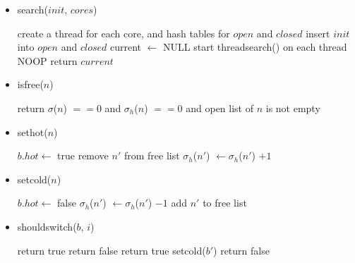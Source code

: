 \documentclass{article}
\begin{document}
\begin{itemize}
  \item search($init$, $cores$)
  \begin{algorithmic}[1]
  \STATE create a thread for each core, and hash tables for $open$ and $closed$
  \STATE insert $init$ into $open$ and $closed$
  \STATE current $\leftarrow$ NULL
  \STATE start threadsearch() on each thread
    \STATE NOOP
  \ENDWHILE
  \STATE return $current$
  \end{algorithmic}
  
  \item isfree($n$)
  \begin{algorithmic}[1]
  \STATE return $\sigma$($n$) $== 0$ and $\sigma_h$($n$) $== 0$ and open list of $n$ is not empty
  \end{algorithmic}
  
  \item sethot($n$)
  \begin{algorithmic}[1]
    \STATE $b.hot \leftarrow$ true
        \STATE remove $n'$ from free list
      \ENDIF
      \STATE $\sigma_h$($n'$) $\leftarrow \sigma_h$($n'$) $+ 1$
    \ENDFOR
  \ENDIF
  \end{algorithmic}
  
  \item setcold($n$)
  \begin{algorithmic}[1]
  \STATE $b.hot \leftarrow$ false
    \STATE $\sigma_h$($n'$) $\leftarrow \sigma_h$($n'$) $- 1$
      \STATE add $n'$ to free list
    \ENDIF
  \ENDFOR
  \end{algorithmic}

  \item shouldswitch($b$, $i$)
  \begin{algorithmic}[1]
  \STATE {}
    \STATE return true
  \ENDIF
    \STATE return false
    \STATE return true
  \ELSE
        \STATE setcold($b'$)
      \ENDIF
    \ENDFOR
    \STATE return false
  \ENDIF
  \end{algorithmic}


\end{itemize}
\end{document}
